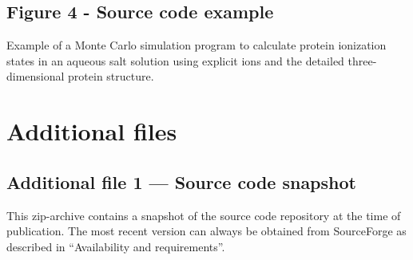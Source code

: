 \documentclass[10pt]{bmc_article}
\def\texttt{[image: ]}
\newenvironment{bmcformat}{\begin{raggedright}\baselineskip20pt\sloppy\setboolean{publ}{false}}{\end{raggedright}\baselineskip20pt\sloppy}
\begin{document}
\begin{bmcformat}
  \subsection*{Figure 4 - Source code example}
      Example of a Monte Carlo simulation program to calculate protein
      ionization states in an aqueous salt solution using explicit ions and the detailed three-dimensional protein structure. 
      \begin{figure}[ht]\center
      \end{figure}
      
\begin{comment}

\section*{Tables}
  \subsection*{Table 1 - Sample table title}
    Here is an example of a \emph{small} table in \LaTeX\ using  
    \verb|\tabular{...}|. This is where the description of the table 
    should go. \par \mbox{}
    \par
    \mbox{
      \begin{tabular}{|c|c|c|}
        \hline \multicolumn{3}{|c|}{My Table}\\ \hline
        A1 & B2  & C3 \\ \hline
        A2 & ... & .. \\ \hline
        A3 & ..  & .  \\ \hline
      \end{tabular}
      }
  \subsection*{Table 2 - Sample table title}
    Large tables are attached as separate files but should
    still be described here.
\end{comment}


\section*{Additional files}
  \subsection*{Additional file 1 --- Source code snapshot}
   This zip-archive contains a snapshot of the source code
   repository at the time of publication. The most recent version
   can always be obtained from SourceForge as described in ``Availability and requirements''.
\end{bmcformat}
\end{document}
